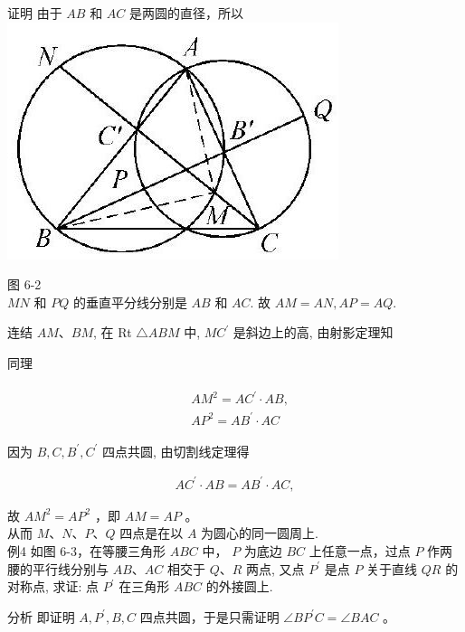 \documentclass[10pt]{article}
\begin{document}
证明 由于 $A B$ 和 $A C$ 是两圆的直径，所以\\
\includegraphics[max width=\textwidth, center]{2024_10_30_66b8e5e701da2093c133g-044}

图 6-2\\
$M N$ 和 $P Q$ 的垂直平分线分别是 $A B$ 和 $A C$. 故 $A M=A N, A P=A Q$.

连结 $A M 、 B M$, 在 Rt $\triangle A B M$ 中, $M C^{\prime}$ 是斜边上的高, 由射影定理知

同理

\begin{align*}
\begin{aligned}
& A M^{2}=A C^{\prime} \cdot A B, \\
& A P^{2}=A B^{\prime} \cdot A C
\end{aligned}
\end{align*}

因为 $B, C, B^{\prime}, C^{\prime}$ 四点共圆, 由切割线定理得

\begin{align*}
A C^{\prime} \cdot A B=A B^{\prime} \cdot A C,
\end{align*}

故 $A M^{2}=A P^{2}$ ，即 $A M=A P$ 。\\
从而 $M 、 N 、 P 、 Q$ 四点是在以 $A$ 为圆心的同一圆周上.\\
例4 如图 6-3，在等腰三角形 $A B C$ 中， $P$ 为底边 $B C$ 上任意一点，过点 $P$ 作两腰的平行线分别与 $A B 、 A C$ 相交于 $Q 、 R$ 两点, 又点 $P^{\prime}$ 是点 $P$ 关于直线 $Q R$ 的对称点, 求证: 点 $P^{\prime}$ 在三角形 $A B C$ 的外接圆上.

分析 即证明 $A, P^{\prime}, B, C$ 四点共圆，于是只需证明 $\angle B P^{\prime} C=\angle B A C$ 。
\end{document}
